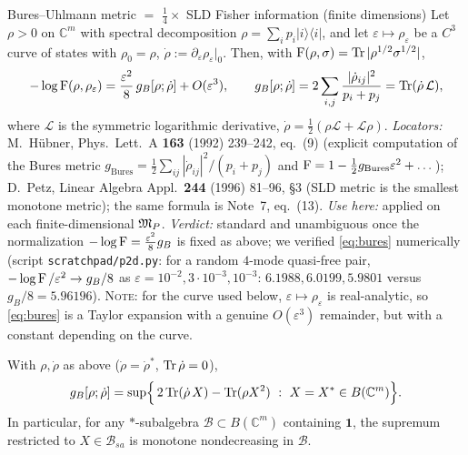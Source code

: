 \documentclass[11pt]{article}
\newcommand{\one}{\mathbf 1}
\theoremstyle{definition}\newtheorem{problem}[theorem]{Problem}
\begin{document}
\begin{citedbox}{Bures--Uhlmann metric \(=\) \(\frac14\times\) SLD Fisher information (finite dimensions)}
Let \(\rho>0\) on \(\mathbb C^m\) with spectral decomposition \(\rho=\sum_ip_i\lvert i\rangle\langle i\rvert\), and let
\(\varepsilon\mapsto\rho_\varepsilon\) be a \(C^3\) curve of states with \(\rho_0=\rho\),
\(\dot\rho:=\partial_\varepsilon\rho_\varepsilon|_0\).  Then, with
\(\operatorname{F}(\rho,\sigma)=\operatorname{Tr}|\rho^{1/2}\sigma^{1/2}|\),
\begin{equation}\label{eq:bures}
 -\log\operatorname{F}(\rho,\rho_\varepsilon)=\frac{\varepsilon^2}{8}\,g_B[\rho;\dot\rho]+O(\varepsilon^3),
 \qquad g_B[\rho;\dot\rho]=2\sum_{i,j}\frac{|\dot\rho_{ij}|^2}{p_i+p_j}=\operatorname{Tr}(\dot\rho\,\mathcal L),
\end{equation}
where \(\mathcal L\) is the symmetric logarithmic derivative,
\(\dot\rho=\frac12(\rho\mathcal L+\mathcal L\rho)\).  \emph{Locators:} M.~H\"ubner, Phys.\ Lett.\ A
\textbf{163} (1992) 239--242, eq.~(9) (explicit computation of the Bures metric
\(g_{\mathrm{Bures}}=\frac12\sum_{ij}|\dot\rho_{ij}|^2/(p_i+p_j)\) and
\(\operatorname{F}=1-\frac12 g_{\mathrm{Bures}}\varepsilon^2+\dots\)); D.~Petz, Linear Algebra Appl.\
\textbf{244} (1996) 81--96, \S3 (SLD metric is the smallest monotone metric); the same formula is
Note~7, eq.~(13).  \emph{Use here:} applied on each finite-dimensional \(\mathfrak M_P\).
\emph{Verdict:} standard and unambiguous once the normalization \(-\log\operatorname{F}=\frac{\varepsilon^2}8g_B\)
is fixed as above; we verified \eqref{eq:bures} numerically (script
\texttt{scratchpad/p2d.py}: for a random \(4\)-mode quasi-free pair,
\(-\log\operatorname{F}/\varepsilon^2\to g_B/8\) as \(\varepsilon=10^{-2},3\cdot10^{-3},10^{-3}\):
\(6.1988,6.0199,5.9801\) versus \(g_B/8=5.96196\)).  \textsc{Note}: for the curve used below,
\(\varepsilon\mapsto\rho_\varepsilon\) is real-analytic, so \eqref{eq:bures} is a Taylor expansion
with a genuine \(O(\varepsilon^3)\) remainder, but with a constant depending on the curve.
\end{citedbox}

\begin{lemma}\label{lem:legendre}
With \(\rho,\dot\rho\) as above (\(\dot\rho=\dot\rho^*\), \(\operatorname{Tr}\dot\rho=0\)),
\begin{equation}\label{eq:legendre}
 g_B[\rho;\dot\rho]=\sup\Bigl\{\,2\Tr(\dot\rho\,X)-\Tr(\rho X^2)\ :\ X=X^*\in B(\mathbb C^m)\Bigr\}.
\end{equation}
In particular, for any \(*\)-subalgebra \(\mathcal B\subset B(\mathbb C^m)\) containing \(\one\), the
supremum restricted to \(X\in\mathcal B_{sa}\) is monotone nondecreasing in \(\mathcal B\).
\end{lemma}
\end{document}
